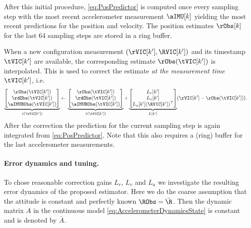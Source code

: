 After this initial procedure, \eqref{eq:PosPredictor} is computed once every sampling step with the most recent accelerometer measurement $\aIMU[k]$ yielding the most recent predictions for the position and velocity.
The position estimates $\rObs[k]$ for the last 64 sampling steps are stored in a ring buffer.

When a new configuration measurement $(\rVIC[k'], \RVIC[k'])$ and its timestamp $\tVIC[k']$ are available, the corresponding estimate $\rObs(\tVIC[k'])$ is interpolated.
This is used to correct the estimate \textit{at the measurement time} $\tVIC[k']$, i.e.\
\begin{align}\label{eq:PosCorrector}
 \underbrace{\begin{bmatrix} \rObs(\tVIC[k']) \\ \rdObs(\tVIC[k']) \\ \aIMUBObs(\tVIC[k']) \end{bmatrix}}_{\hat{z}(\tVIC[k'])}
 \leftarrow 
 \underbrace{\begin{bmatrix} \rObs(\tVIC[k']) \\ \rdObs(\tVIC[k']) \\ \aIMUBObs(\tVIC[k']) \end{bmatrix}}_{\hat{z}(\tVIC[k'])}
 +
 \underbrace{\begin{bmatrix} L_r[k'] \\ L_v[k'] \\ L_a[k'] (\RVIC[k'])^\top \end{bmatrix}}_{L[k']}
 (\rVIC[k'] - \rObs(\tVIC[k'])).
\end{align}
After the correction the prediction for the current sampling step is again integrated from \eqref{eq:PosPredictor}.
Note that this also requires a (ring) buffer for the last accelerometer measurements.

\paragraph{Error dynamics and tuning.}
To chose reasonable correction gains $L_r$, $L_v$ and $L_a$ we investigate the resulting error dynamics of the proposed estimator.
Here we do the coarse assumption that the attitude is constant and perfectly known $\RObs = \bar{\R}$.
Then the dynamic matrix $A$ in the continuous model \eqref{eq:AccelerometerDynamicsState} is constant and is denoted by $\bar{A}$.

